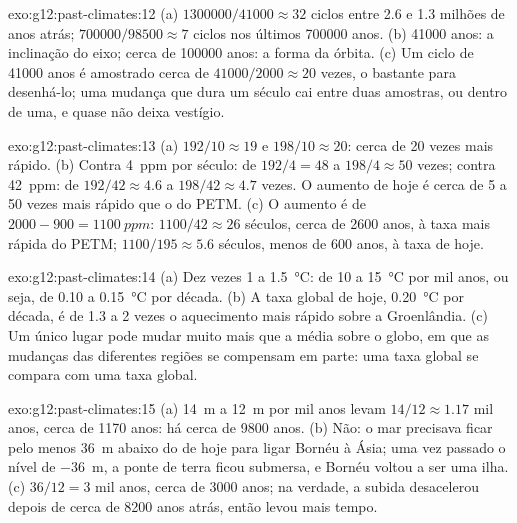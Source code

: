 \begin{solution}{exo:g12:past-climates:12}
(a) $\num{1300000}/\num{41000} \approx 32$ ciclos entre 2.6 e 1.3
milhões de anos atrás; $\num{700000}/\num{98500} \approx 7$ ciclos nos últimos
\num{700000} anos. (b) \num{41000} anos: a inclinação do eixo; cerca de
\num{100000} anos: a forma da órbita. (c) Um ciclo de \num{41000} anos é
amostrado cerca de $\num{41000}/\num{2000} \approx 20$ vezes, o bastante para
desenhá-lo; uma mudança que dura um século cai entre duas amostras, ou dentro
de uma, e quase não deixa vestígio.
\end{solution}

\begin{solution}{exo:g12:past-climates:13}
(a) $192/10 \approx 19$ e $198/10 \approx 20$: cerca de 20 vezes mais rápido.
(b) Contra \qty{4}{ppm} por século: de $192/4 = 48$ a $198/4 \approx 50$
vezes; contra \qty{42}{ppm}: de $192/42 \approx 4.6$ a $198/42 \approx 4.7$
vezes. O aumento de hoje é cerca de 5 a 50 vezes mais rápido que o do PETM.
(c) O aumento é de $2000 - 900 = \qty{1100}{ppm}$: $1100/42 \approx 26$ séculos,
cerca de \num{2600} anos, à taxa mais rápida do PETM; $1100/195 \approx 5.6$
séculos, menos de 600 anos, à taxa de hoje.
\end{solution}

\begin{solution}{exo:g12:past-climates:14}
(a) Dez vezes 1 a \qty{1.5}{\degreeCelsius}: de 10 a \qty{15}{\degreeCelsius}
por mil anos, ou seja, de 0.10 a \qty{0.15}{\degreeCelsius} por década.
(b) A taxa global de hoje, \qty{0.20}{\degreeCelsius} por década, é de 1.3 a
2 vezes o aquecimento mais rápido sobre a Groenlândia. (c) Um único lugar
pode mudar muito mais que a média sobre o globo, em que as mudanças das
diferentes regiões se compensam em parte: uma taxa global se compara com
uma taxa global.
\end{solution}

\begin{solution}{exo:g12:past-climates:15}
(a) \qty{14}{m} a \qty{12}{m} por mil anos levam $14/12 \approx
1.17$ mil anos, cerca de \num{1170} anos: há cerca de \num{9800} anos.
(b) Não: o mar precisava ficar pelo menos \qty{36}{m} abaixo do de hoje
para ligar Bornéu à Ásia; uma vez passado o nível de \qty{-36}{m}, a ponte
de terra ficou submersa, e Bornéu voltou a ser uma ilha. (c) $36/12 = 3$
mil anos, cerca de \num{3000} anos; na verdade, a subida desacelerou depois
de cerca de \num{8200} anos atrás, então levou mais tempo.
\end{solution}

